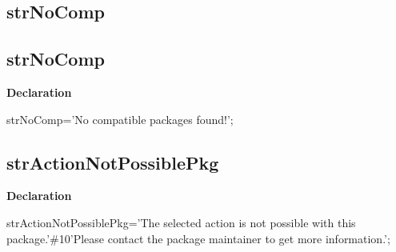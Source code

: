 \documentclass{report}
\newif\ifpdf
\begin{document}
\subsection*{\large{\textbf{strNoComp}}\normalsize\hspace{1ex}\hrulefill}
\else
\subsection*{strNoComp}
\fi
\label{trstrings-strNoComp}
\begin{list}{}{
\setlength{\itemindent}{0cm}
\setlength{\listparindent}{0cm}
\setlength{\leftmargin}{\evensidemargin}
\addtolength{\leftmargin}{\tmplength}
\settowidth{\labelsep}{X}
\addtolength{\leftmargin}{\labelsep}
\setlength{\labelwidth}{\tmplength}
}
\item[\textbf{Declaration}\hfill]
\ifpdf
\begin{flushleft}
\fi
\begin{ttfamily}
strNoComp='No compatible packages found!';\end{ttfamily}

\ifpdf
\end{flushleft}
\fi

\end{list}
\ifpdf
\subsection*{\large{\textbf{strActionNotPossiblePkg}}\normalsize\hspace{1ex}\hrulefill}
\else
\subsection*{strActionNotPossiblePkg}
\fi
\label{trstrings-strActionNotPossiblePkg}
\begin{list}{}{
\setlength{\itemindent}{0cm}
\setlength{\listparindent}{0cm}
\setlength{\leftmargin}{\evensidemargin}
\addtolength{\leftmargin}{\tmplength}
\settowidth{\labelsep}{X}
\addtolength{\leftmargin}{\labelsep}
\setlength{\labelwidth}{\tmplength}
}
\item[\textbf{Declaration}\hfill]
\ifpdf
\begin{flushleft}
\fi
\begin{ttfamily}
strActionNotPossiblePkg='The selected action is not possible with this package.'{\#}10'Please contact the package maintainer to get more information.';\end{ttfamily}

\ifpdf
\end{flushleft}
\fi

\end{list}
\ifpdf
\end{document}
